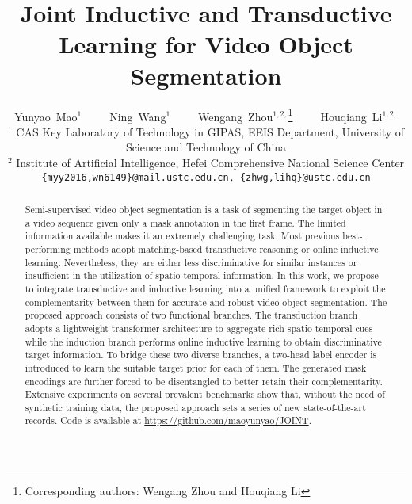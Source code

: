 \documentclass[10pt,twocolumn,letterpaper]{article}
\begin{document}
\title{Joint Inductive and Transductive Learning for Video Object Segmentation}

\author{Yunyao~Mao$^{1}$~~~~~Ning~Wang$^{1}$~~~~~Wengang~Zhou$^{1,2,}$\thanks{Corresponding authors: Wengang Zhou and Houqiang Li}~~~~~Houqiang~Li$^{1,2,}$\footnotemark[1] \\
	{\normalsize $^{1}$ CAS Key Laboratory of Technology in GIPAS, EEIS Department, University of Science and Technology of China} \\
	{\normalsize $^{2}$ Institute of Artificial Intelligence, Hefei Comprehensive National Science Center} \\
	{\tt\small \{myy2016,wn6149\}@mail.ustc.edu.cn, \{zhwg,lihq\}@ustc.edu.cn}
}

\maketitle
\ificcvfinal\thispagestyle{empty}\fi

\begin{abstract}
Semi-supervised video object segmentation is a task of segmenting the target object in a video sequence given only a mask annotation in the first frame. The limited information available makes it an extremely challenging task. Most previous best-performing methods adopt matching-based transductive reasoning or online inductive learning. Nevertheless, they are either less discriminative for similar instances or insufficient in the utilization of spatio-temporal information. In this work, we propose to integrate transductive and inductive learning into a unified framework to exploit the complementarity between them for accurate and robust video object segmentation. The proposed approach consists of two functional branches. The transduction branch adopts a lightweight transformer architecture to aggregate rich spatio-temporal cues while the induction branch performs online inductive learning to obtain discriminative target information.
To bridge these two diverse branches, a two-head label encoder is introduced to learn the suitable target prior for each of them. The generated mask encodings are further forced to be disentangled to better retain their complementarity. 
Extensive experiments on several prevalent benchmarks show that, without the need of synthetic training data, the proposed approach sets a series of new state-of-the-art records. Code is available at \url{https://github.com/maoyunyao/JOINT}.
\end{abstract}
\end{document}
